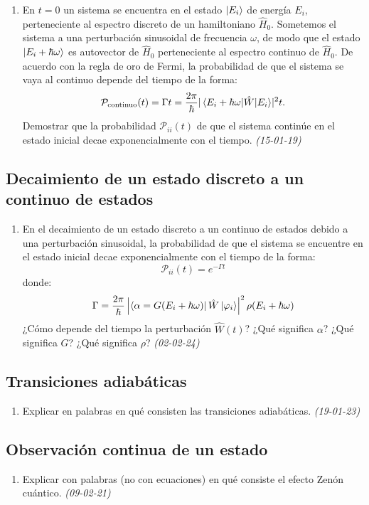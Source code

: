 \begin{enumerate}
    \item En $t = 0$ un sistema se encuentra en el estado $\ket{E_i}$ de energía $E_i$, perteneciente al espectro discreto de un hamiltoniano $\hat{H}_0$. Sometemos el sistema a una perturbación sinusoidal de frecuencia $\omega$, de modo que el estado $\ket{E_i + \hbar \omega}$ es autovector de $\hat{H}_0$ perteneciente al espectro continuo de $\hat{H}_0$. De acuerdo con la regla de oro de Fermi, la probabilidad de que el sistema se vaya al continuo depende del tiempo de la forma:
    \[
    \mathcal{P}_{\text{continuo}}(t) = \Gamma t = \frac{2 \pi}{\hbar} \lvert\mel{E_i + \hbar \omega}{\hat{W}}{E_i}\rvert^2 t.
    \]
    Demostrar que la probabilidad $\mathcal{P}_{ii}(t)$ de que el sistema continúe en el estado inicial decae exponencialmente con el tiempo. \textit{(15-01-19)}

\end{enumerate}

\subsection*{Decaimiento de un estado discreto a un continuo de estados}

\begin{enumerate}
    \item En el decaimiento de un estado discreto a un continuo de estados debido a una perturbación sinusoidal, la probabilidad de que el sistema se encuentre en el estado inicial decae exponencialmente con el tiempo de la forma:
    \[
    \mathcal{P}_{ii} (t) = e^{-\Gamma t}
    \]
    donde:
    \[
    \Gamma = \frac{2 \pi}{\hbar} \left| \bra{\alpha = G(E_i + \hbar \omega)} \hat{W} \ket{\varphi_i} \right|^2 \rho (E_i + \hbar \omega)
    \]
    ¿Cómo depende del tiempo la perturbación \(\hat{W} (t)\)? ¿Qué significa \(\alpha\)? ¿Qué significa \(G\)? ¿Qué significa \(\rho\)? \textit{(02-02-24)}
\end{enumerate}

\subsection*{Transiciones adiabáticas}

\begin{enumerate}
    \item Explicar en palabras en qué consisten las transiciones adiabáticas. \textit{(19-01-23)}
\end{enumerate}

\subsection*{Observación continua de un estado}

\begin{enumerate}    

    \item Explicar con palabras (no con ecuaciones) en qué consiste el efecto Zenón cuántico. \textit{(09-02-21)}

\end{enumerate}